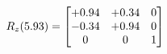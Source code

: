 \documentclass[preview]{standalone}
\begin{document}
\begin{align*}
\special{dvisvgm:raw <g id='unique000'>}R_{z}(5.93) = \begin{bmatrix}+0.94 & +0.34 & 0 \\-0.34 & +0.94 & 0 \\0 & 0 & 1\end{bmatrix}\special{dvisvgm:raw </g>}
\end{align*}
\end{document}
